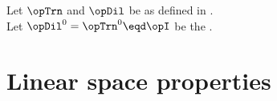 \begin{proposition}
\label{prop:DjTn}
Let $\opTrn$ and $\opDil$ be as defined in .\\
Let $\opDil^0=\opTrn^0\eqd\opI$ be the .
\end{proposition}
%
%

\section{Linear space properties}

